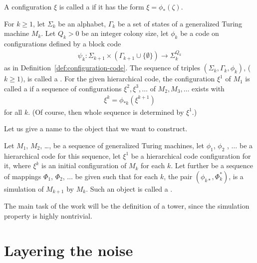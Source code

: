 \documentclass[12pt]{memoir}
\begin{document}
 \begin{definition}\label{def:code-config}
   A configuration $\xi$ is called a  if 
it has the form \( \xi=\phi_{*}(\zeta) \).
 \end{definition}


\begin{definition}\label{def:hierarchical-code}
For $k\ge 1$, let $\Sigma_k$ be an alphabet, $\Gamma_k$ be
a set of states of a generalized Turing machine $M_k$.
Let $Q_k>0$ be an integer colony size, let $\phi_k$
be a code on configurations defined by a block code
  \begin{align*}
       \psi_k: \Sigma_{k+1}\times(\Gamma_{k+1}\cup\{\emptyset\})
       \rightarrow \Sigma_k^{Q_k}
  \end{align*}
as in Definition~\ref{def:configuration-code}.
The sequence of triples $(\Sigma_k,\Gamma_k,  \phi_k)$, ($k\ge 1)$,  is
called a .
For the given hierarchical code, the configuration \( \xi^{1} \) of \( M_{1} \)
is called a  if a sequence
of configurations $\xi^{2},\xi^{3},\dots$ of \( M_{2},M_{3},\dots \) exists with
\begin{align*}
 \xi^{k}=\phi_{*k}(\xi^{k+1})
 \end{align*} 
for all \( k \).
(Of course, then whole sequence is determined by \( \xi^{1} \).)
\end{definition}

Let us give a name to the object that we want to construct.

\begin{definition}[A tower]\label{def:tower}
Let $M_1$, $M_2$, \dots, be a sequence of generalized Turing machines,
let \( \phi_{1} \), \( \phi_{2} \) , \(\dots \) be a hierarchical code for this sequence,
let \( \xi^{1} \) be a hierarchical code configuration for it, where \( \xi^{k} \) is an
initial configuration of \( M_{k} \) for each \( k \).
Let further be a sequence of mappings \( \Phi_{1} \), \( \Phi_{2} \), \( \dots \) be
given such that for each \( k \), the pair $(\phi_{k*},\Phi_{k}^{*})$,
is a simulation of \( M_{k+1} \) by \( M_{k} \).
Such an object is called a .
\end{definition}

The main task of the work will be the definition of a tower, since the simulation
property is highly nontrivial.


\section{Layering the noise}\label{sec:noise}
\end{document}
